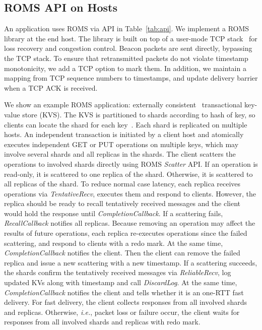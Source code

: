 \iffalse
\subsection{ROMS API on Hosts}
\label{sec:api}

An application uses ROMS via API in Table~\ref{tab:api}.
We implement a ROMS library at the end host. The library is built on top of a user-mode TCP stack~\cite{libvma,dunkels2001design} for loss recovery and congestion control. Beacon packets are sent directly, bypassing the TCP stack. To ensure that retransmitted packets do not violate timestamp monotonicity, we add a TCP option to mark them. In addition, we maintain a mapping from TCP sequence numbers to timestamps, and update delivery barrier when a TCP ACK is received.

We show an example ROMS application: externally consistent~\cite{corbett2013spanner} transactional key-value store (KVS).
The KVS is partitioned to shards according to hash of key, so clients can locate the shard for each key~\cite{nishtala2013scaling,eris}.
Each shard is replicated on multiple hosts.
An independent transaction is initiated by a client host and atomically executes independent GET or PUT operations on multiple keys, which may involve several shards and all replicas in the shards.
The client scatters the operations to involved shards directly using ROMS \emph{Scatter} API.
If an operation is read-only, it is scattered to one replica of the shard. Otherwise, it is scattered to all replicas of the shard.
To reduce normal case latency, each replica receives operations via \emph{TentativeRecv}, executes them and respond to clients.
However, the replica should be ready to recall tentatively received messages and the client would hold the response until \emph{CompletionCallback}.
If a scattering fails, \emph{RecallCallback} notifies all replicas.
Because removing an operation may affect the results of future operations, each replica re-executes operations since the failed scattering, and respond to clients with a redo mark.
At the same time, \emph{CompletionCallback} notifies the client. Then the client can remove the failed replica and issue a new scattering with a new timestamp.
If a scattering succeeds, the shards confirm the tentatively received messages via \emph{ReliableRecv}, log updated KVs along with timestamp and call \emph{DiscardLog}.
At the same time, \emph{CompletionCallback} notifies the client and tells whether it is an one-RTT fast delivery.
For fast delivery, the client collects responses from all involved shards and replicas.
Otherwise, \emph{i.e.}, packet loss or failure occur, the client waits for responses from all involved shards and replicas with redo mark.

